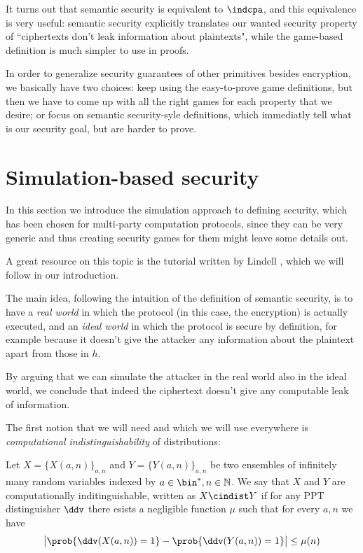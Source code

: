 It turns out that semantic security is equivalent to $\indcpa$, and this equivalence is very useful: semantic security explicitly translates our wanted security property of ``ciphertexts don't leak information about plaintexts", while the game-based definition is much simpler to use in proofs.

In order to generalize security guarantees of other primitives besides encryption, we basically have two choices: keep using the easy-to-prove game definitions, but then we have to come up with all the right games for each property that we desire; or focus on semantic security-syle definitions, which immediatly tell what is our security goal, but are harder to prove.

\section{Simulation-based security}
In this section we introduce the simulation approach to defining security, which has been chosen for multi-party computation protocols, since they can be very generic and thus creating security games for them might leave some details out.

A great resource on this topic is the tutorial written by Lindell \cite{Lindell_tutorial}, which we will follow in our introduction.

The main idea, following the intuition of the definition of semantic security, is to have a \emph{real world} in which the protocol (in this case, the encryption) is actually executed, and an \emph{ideal world} in which the protocol is secure by definition, for example because it doesn't give the attacker any information about the plaintext apart from those in $h$.

By arguing that we can simulate the attacker in the real world also in the ideal world, we conclude that indeed the ciphertext doesn't give any computable leak of information.

The first notion that we will need and which we will use everywhere is \emph{computational indistinguishability} of distributions:
\begin{definition}
    Let $X=\{ X(a,n) \}_{a,n}$ and $Y=\{ Y(a,n) \}_{a,n}$ be two ensembles of infinitely many random variables indexed by $a\in\bin^\ast,n\in\N$. We say that $X$ and $Y$ are computationally inditinguishable, written as $X\cindist Y$ if for any PPT distinguisher $\ddv$ there esists a negligible function $\mu$ such that for every $a,n$ we have
    $$\left| \prob{\ddv(X(a,n))=1} - \prob{\ddv(Y(a,n))=1} \right|\le\mu(n)$$
\end{definition}

